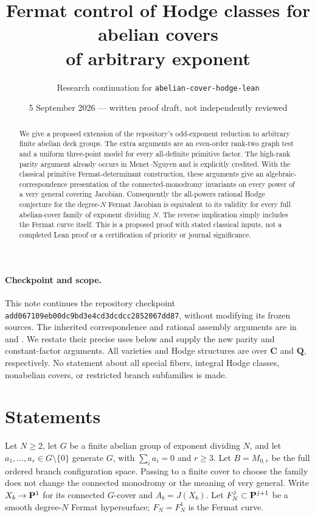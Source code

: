 \documentclass[11pt]{article}
\title{Fermat control of Hodge classes for abelian covers\\of arbitrary exponent}
\author{Research continuation for \texttt{abelian-cover-hodge-lean}}
\date{5 September 2026 --- written proof draft, not independently reviewed}
\theoremstyle{remark}\newtheorem{remark}[theorem]{Remark}
\newcommand{\Q}{\mathbf Q}\newcommand{\C}{\mathbf C}
\begin{document}
\maketitle
\begin{abstract}
We give a proposed extension of the repository's odd-exponent reduction to
arbitrary finite abelian deck groups. The extra arguments are an even-order
rank-two graph test and a uniform three-point model for every all-definite
primitive factor. The high-rank parity argument already occurs in
Menet--Nguyen and is explicitly credited. With the classical primitive
Fermat-determinant construction, these arguments give an algebraic-correspondence
presentation of the connected-monodromy invariants on every power of a
very general covering Jacobian. Consequently the all-powers rational Hodge
conjecture for the degree-$N$ Fermat Jacobian is equivalent to its validity
for every full abelian-cover family of exponent dividing $N$. The reverse
implication simply includes the Fermat curve itself. This is a proposed
proof with stated classical inputs, not a completed Lean proof or a
certification of priority or journal significance.
\end{abstract}

\paragraph{Checkpoint and scope.}
This note continues the repository checkpoint\\
{\small\texttt{add067109eb00dc9bd3e4cd3dcdcc2852067dd87}},
without modifying its frozen sources. The inherited correspondence and rational
assembly arguments are in \cite[Sections 4--6]{General} and
\cite[Section 7]{Structural}. We restate their precise uses below and supply
the new parity and constant-factor arguments. All varieties and Hodge
structures are over $\C$ and $\Q$, respectively. No statement about all
special fibers, integral Hodge classes, nonabelian covers, or restricted
branch subfamilies is made.

\section{Statements}
Let $N\geq2$, let $G$ be a finite abelian group of exponent dividing $N$,
and let $a_1,\ldots,a_r\in G\setminus\{0\}$ generate $G$, with
$\sum_i a_i=0$ and $r\geq3$. Let $B=M_{0,r}$ be the full ordered branch
configuration space. Passing to a finite cover to choose the family does
not change the connected monodromy or the meaning of very general. Write
$X_b\to\mathbf P^1$ for its connected $G$-cover and $A_b=J(X_b)$.
Let $F_N^j\subset\mathbf P^{j+1}$ be a smooth degree-$N$ Fermat hypersurface;
$F_N=F_N^1$ is the Fermat curve.
\end{document}
